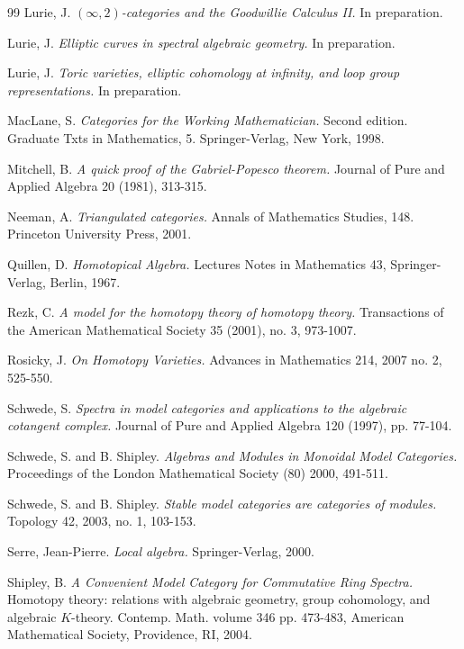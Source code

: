 \documentclass{article}
\theoremstyle{definition}
\begin{document}
\begin{thebibliography}{99}
 Lurie, J. {\it $(\infty,2)$-categories and the Goodwillie Calculus II.} In preparation.

 Lurie, J. {\it Elliptic curves in spectral algebraic geometry.} In preparation.

 Lurie, J. {\it Toric varieties, elliptic cohomology at infinity, and loop group representations.} In preparation.

 MacLane, S. {\it Categories for the Working Mathematician.} Second edition. Graduate Txts in Mathematics, 5. Springer-Verlag, New York, 1998.

 Mitchell, B. {\it A quick proof of the
Gabriel-Popesco theorem.} Journal of Pure and Applied Algebra 20
(1981), 313-315.

 Neeman, A. {\it Triangulated categories.} Annals
of Mathematics Studies, 148. Princeton University Press, 2001.

 Quillen, D. {\it Homotopical Algebra.} Lectures Notes in Mathematics 43, Springer-Verlag, Berlin, 1967. 

 Rezk, C. {\it A model for the homotopy theory of homotopy theory.} Transactions of the American Mathematical Society 35 (2001), no. 3, 973-1007.

 Rosicky, J. {\it On Homotopy Varieties.} Advances in Mathematics
214, 2007 no. 2, 525-550.

 Schwede, S. {\it Spectra in model categories and applications to the algebraic
cotangent complex.} Journal of Pure and Applied Algebra 120 (1997), pp.
77-104.

 Schwede, S. and B. Shipley. {\it Algebras and Modules in Monoidal Model Categories.} Proceedings of the London Mathematical Society (80) 2000, 491-511.

 Schwede, S. and B. Shipley. {\it Stable model categories are categories of modules.} Topology 42, 2003, no. 1, 103-153.

 Serre, Jean-Pierre. {\it Local algebra.}
Springer-Verlag, 2000.

 Shipley, B. {\it A Convenient Model Category for Commutative Ring Spectra.} Homotopy theory: relations with algebraic geometry, group cohomology, and algebraic $K$-theory. Contemp. Math. volume 346 pp. 473-483, American Mathematical Society, Providence, RI, 2004. 


\end{thebibliography}
\end{document}
